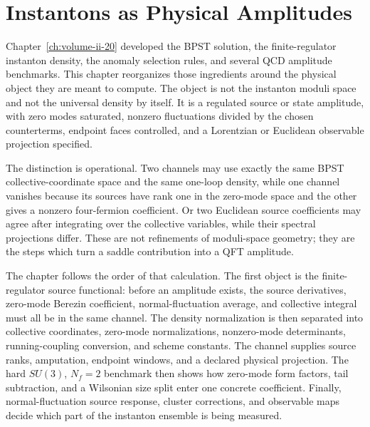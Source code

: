 \chapter{Instantons as Physical Amplitudes}
\label{ch:instantons-physical-amplitudes}

Chapter~\ref{ch:volume-ii-20} developed the BPST solution, the
finite-regulator instanton density, the anomaly selection rules, and several
QCD amplitude benchmarks.  This chapter reorganizes those ingredients around
the physical object they are meant to compute.  The object is not the
instanton moduli space and not the universal density by itself.  It is a
regulated source or state amplitude, with zero modes saturated, nonzero
fluctuations divided by the chosen counterterms, endpoint faces controlled,
and a Lorentzian or Euclidean observable projection specified.

The distinction is operational.  Two channels may use exactly the same BPST
collective-coordinate space and the same one-loop density, while one channel
vanishes because its sources have rank one in the zero-mode space and the
other gives a nonzero four-fermion coefficient.  Or two Euclidean source
coefficients may agree after integrating over the collective variables, while
their spectral projections differ.  These are not refinements of moduli-space
geometry; they are the steps which turn a saddle contribution into a QFT
amplitude.

The chapter follows the order of that calculation.  The first object is the
finite-regulator source functional: before an amplitude exists, the source
derivatives, zero-mode Berezin coefficient, normal-fluctuation average, and
collective integral must all be in the same channel.  The density
normalization is then separated into collective coordinates, zero-mode
normalizations, nonzero-mode determinants, running-coupling conversion, and
scheme constants.  The channel supplies source ranks, amputation, endpoint
windows, and a declared physical projection.  The hard \(SU(3)\), \(N_f=2\)
benchmark then shows how zero-mode form factors, tail subtraction, and a
Wilsonian size split enter one concrete coefficient.  Finally,
normal-fluctuation source response, cluster corrections, and observable maps
decide which part of the instanton ensemble is being measured.

